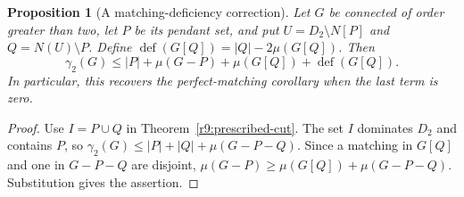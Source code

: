 \documentclass[11pt,a4paper]{article}
\newtheorem{proposition}[theorem]{Proposition}
\theoremstyle{remark}
\begin{document}
\begin{proposition}[A matching-deficiency correction]
\label{r9:deficiency}
Let $G$ be connected of order greater than two, let $P$ be its pendant
set, and put $U=D_2\setminus N[P]$ and $Q=N(U)\setminus P$. Define
$\operatorname{def}(G[Q])=|Q|-2\mu(G[Q])$. Then
\[
 \gamma_2(G)\le |P|+\mu(G-P)+\mu(G[Q])
                       +\operatorname{def}(G[Q]).
\]
In particular, this recovers the perfect-matching corollary when the
last term is zero.
\end{proposition}
\begin{proof}
Use $I=P\cup Q$ in Theorem~\ref{r9:prescribed-cut}. The set $I$ dominates
$D_2$ and contains $P$, so
$\gamma_2(G)\le |P|+|Q|+\mu(G-P-Q)$.
Since a matching in $G[Q]$ and one in $G-P-Q$ are disjoint,
$\mu(G-P)\ge\mu(G[Q])+\mu(G-P-Q)$.
Substitution gives the assertion.
\end{proof}
\end{document}
